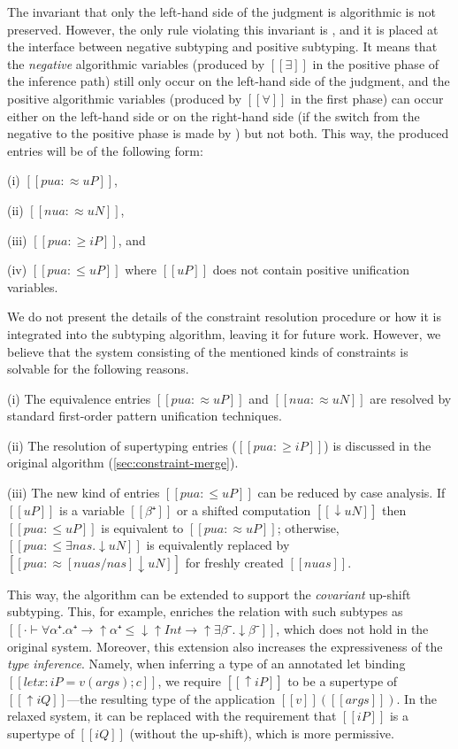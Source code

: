 The invariant that only the left-hand side of the judgment is algorithmic is not
preserved. However, the only rule violating this invariant is
, and it is placed at the interface between
negative subtyping and positive subtyping. It means that the \emph{negative}
algorithmic variables (produced by $[[∃]]$ in the positive phase of the
inference path) still only occur on the left-hand side of the judgment, and the
positive algorithmic variables (produced by $[[∀]]$ in the first phase) can
occur either on the left-hand side or on the right-hand side (if the switch from
the negative to the positive phase is made by )
but not both.
This way, the produced entries will be of the following form:
\begin{itemize*}
    \item[(i)] $[[pua :≈ uP]]$, 
    \item[(ii)] $[[nua :≈ uN]]$, 
    \item[(iii)] $[[pua :≥ iP]]$, and
    \item[(iv)] $[[pua :≤ uP]]$ where $[[uP]]$ does not contain positive unification variables.
\end{itemize*}

We do not present the details of the constraint resolution procedure or how it
is integrated into the subtyping algorithm, leaving it for future work. However,
we believe that the system consisting of the mentioned kinds of constraints is solvable
for the following reasons.
\begin{enumerate*}
    \item[(i)] The equivalence entries $[[pua :≈ uP]]$ and $[[nua :≈ uN]]$ are resolved by standard first-order pattern unification techniques.
    \item[(ii)] The resolution of supertyping entries ($[[pua :≥ iP]]$) is discussed in the original algorithm (\cref{sec:constraint-merge}).
    \item[(iii)] The new kind of entries $[[pua :≤ uP]]$ can be
        reduced by case analysis. If $[[uP]]$ is a variable $[[β⁺]]$
        or a shifted computation $[[↓uN]]$ then 
        $[[pua :≤ uP]]$ is equivalent to $[[pua :≈ uP]]$;
        otherwise, $[[pua :≤ ∃nas.↓uN]]$ is equivalently replaced by $[[pua :≈ [nuas/nas]↓uN]]$
        for freshly created $[[nuas]]$.
\end{enumerate*}

This way, the algorithm can be extended to support the \emph{covariant} up-shift
subtyping. This, for example, enriches the relation with such subtypes as $[[· ⊢
∀α⁺.α⁺→↑α⁺ ≤ ↓↑Int → ↑∃β⁻.↓β⁻]]$, which does not hold in the original system.
Moreover, this extension also increases the expressiveness of the \emph{type
inference}. Namely, when inferring a type of an annotated let binding $[[let
x:iP = v(args); c]]$, we require $[[↑iP]]$ to be a supertype of $[[↑iQ]]$---the
resulting type of the application $[[v]]([[args]])$. In the relaxed system, it
can be replaced with the requirement that $[[iP]]$ is a supertype of $[[iQ]]$
(without the up-shift), which is more permissive.


